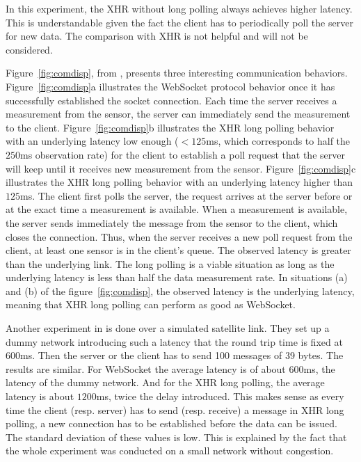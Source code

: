 \documentclass[10pt,journal,compsoc]{IEEEtran}
\newcommand{\ws}{WebSocket}
\begin{document}
In this experiment, the XHR without long polling always achieves higher latency.
This is understandable given the fact the client has to periodically poll the server for new data.
The comparison with XHR is not helpful and will not be considered.

Figure~\ref{fig:comdisp}, from \cite{communicationAndDIsplayingRealTimeDataWithWebSocket}, presents three interesting communication behaviors.
Figure~\ref{fig:comdisp}a illustrates the \ws{} protocol behavior once it has successfully established the socket connection. Each time the server receives a measurement from the sensor, the server can immediately send the measurement to the client.
Figure~\ref{fig:comdisp}b illustrates the XHR long polling behavior with an underlying latency low enough ($< 125 $ms, which corresponds to half the $250$ms observation rate) for the client to establish a poll request that the server will keep until it receives new measurement from the sensor.
Figure~\ref{fig:comdisp}c illustrates the XHR long polling behavior with an underlying latency higher than $125$ms.
The client first polls the server, the request arrives at the server before or at the exact time a measurement is available.
When a measurement is available, the server sends immediately the message from the sensor to the client, which closes the connection.
Thus, when the server receives a new poll request from the client, at least one sensor is in the client's queue.
The observed latency is greater than the underlying link.
The long polling is a viable situation as long as the underlying latency is less than half the data measurement rate.
In  situations (a) and (b) of the figure~\ref{fig:comdisp}, the observed latency is the underlying latency, meaning that XHR long polling can perform as good as \ws{}.



Another experiment in \cite{collinalatency} is done over a simulated satellite link. They set up a dummy network introducing such a latency that the round trip time is fixed at $600$ms. 
Then the server or the client has to send 100 messages of 39 bytes. The results are similar. 
For \ws{} the average latency is of about $600$ms, the latency of the dummy network. And for the XHR long polling, the average latency is about $1200$ms, twice the delay introduced. 
This makes sense as every time the client (resp. server) has to send (resp. receive) a message in XHR long polling, a new connection has to be established before the data can be issued. 
The standard deviation of these values is low. 
This is explained by the fact that the whole experiment was conducted on a small network without congestion.
\end{document}
